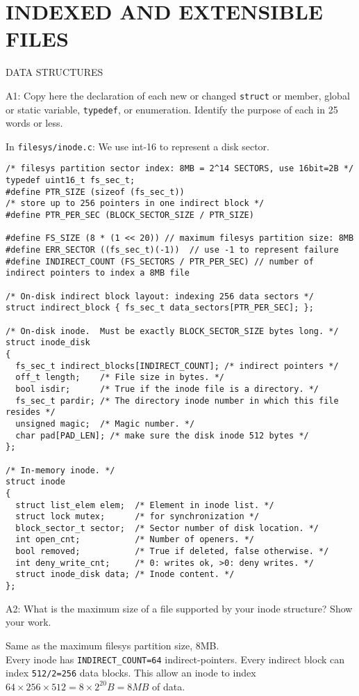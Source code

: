 \section*{INDEXED AND EXTENSIBLE FILES}

\begin{aspect}{DATA STRUCTURES}
	\begin{qc}
		A1: Copy here the declaration of each new or changed \lstinline{struct} or member,
		global or static variable, \lstinline{typedef}, or enumeration.
		Identify the purpose of each in 25 words or less.
	\end{qc}

	In \lstinline{filesys/inode.c}: We use int-16 to represent a disk sector.
	\begin{lstlisting}
/* filesys partition sector index: 8MB = 2^14 SECTORS, use 16bit=2B */
typedef uint16_t fs_sec_t;
#define PTR_SIZE (sizeof (fs_sec_t))
/* store up to 256 pointers in one indirect block */
#define PTR_PER_SEC (BLOCK_SECTOR_SIZE / PTR_SIZE)

#define FS_SIZE (8 * (1 << 20)) // maximum filesys partition size: 8MB
#define ERR_SECTOR ((fs_sec_t)(-1))  // use -1 to represent failure
#define INDIRECT_COUNT (FS_SECTORS / PTR_PER_SEC) // number of indirect pointers to index a 8MB file

/* On-disk indirect block layout: indexing 256 data sectors */
struct indirect_block { fs_sec_t data_sectors[PTR_PER_SEC]; };

/* On-disk inode.  Must be exactly BLOCK_SECTOR_SIZE bytes long. */
struct inode_disk
{
  fs_sec_t indirect_blocks[INDIRECT_COUNT]; /* indirect pointers */
  off_t length;    /* File size in bytes. */
  bool isdir;      /* True if the inode file is a directory. */
  fs_sec_t pardir; /* The directory inode number in which this file resides */
  unsigned magic;  /* Magic number. */
  char pad[PAD_LEN]; /* make sure the disk inode 512 bytes */
};

/* In-memory inode. */
struct inode
{
  struct list_elem elem;  /* Element in inode list. */
  struct lock mutex;      /* for synchronization */
  block_sector_t sector;  /* Sector number of disk location. */
  int open_cnt;           /* Number of openers. */
  bool removed;           /* True if deleted, false otherwise. */
  int deny_write_cnt;     /* 0: writes ok, >0: deny writes. */
  struct inode_disk data; /* Inode content. */
};
\end{lstlisting}

	\begin{qc}
		A2: What is the maximum size of a file supported by your inode
		structure?  Show your work.
	\end{qc}
	Same as the maximum filesys partition size, 8MB.\\
	Every inode has \lstinline{INDIRECT_COUNT=64} indirect-pointers.
	Every indirect block can index \lstinline{512/2=256} data blocks.
	This allow an inode to index $64\times 256\times 512=8\times 2^{20}B = 8MB$ of data.
\end{aspect}

